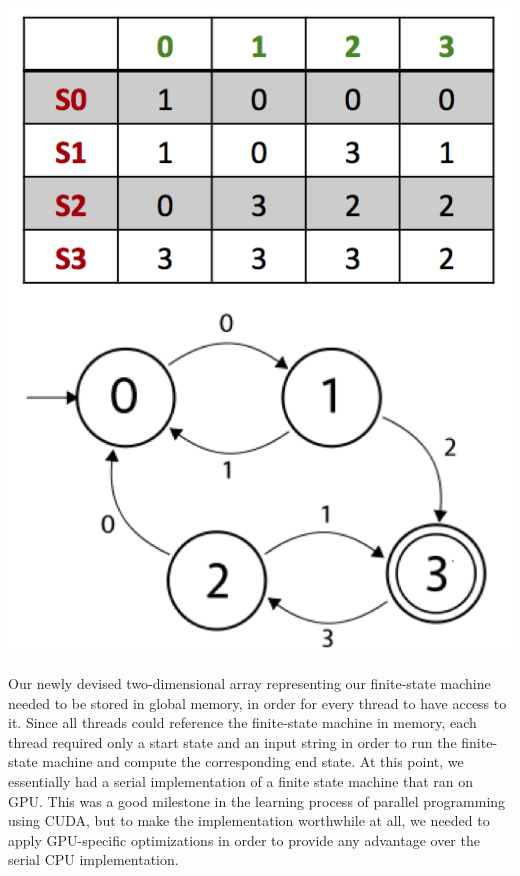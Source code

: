 \documentclass[11pt]{sigplanconf}
\newenvironment{Figure} %
  {\par\medskip\noindent\minipage{\linewidth}}
  {\endminipage\par\medskip}
\begin{document}
\begin{Figure}
\centering
\includegraphics[width=\linewidth]{fsm_storage.png}
\label{fig:CPU vs. GPU}
\end{Figure}

Our newly devised two-dimensional array representing our finite-state machine needed to be stored in global memory, in order for every thread to have access to it. Since all threads could reference the finite-state machine in memory, each thread required only a start state and an input string in order to run the finite-state machine and compute the corresponding end state. At this point, we essentially had a serial implementation of a finite state machine that ran on GPU. This was a good milestone in the learning process of parallel programming using CUDA, but to make the implementation worthwhile at all, we needed to apply GPU-specific optimizations in order to provide any advantage over the serial CPU implementation.
\end{document}
